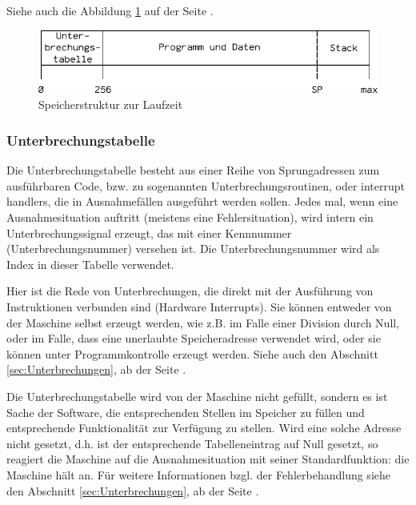 Siehe auch die Abbildung \ref{fig:Speicherstruktur} auf der Seite
\pageref{fig:Speicherstruktur}.

\begin{figure}[htp]
 \centering
 \includegraphics{./img/UMach-Speicherstruktur}
 \caption[Speicherstruktur]{Speicherstruktur zur Laufzeit}
 \label{fig:Speicherstruktur}
\end{figure}



\subsubsection{Unterbrechungstabelle}
\label{subsubsec:Unterbrechungstabelle}

Die Unterbrechungstabelle besteht aus einer Reihe von Sprungadressen zum
ausführbaren Code, bzw. zu sogenannten Unterbrechungsroutinen, oder \glqq
interrupt handlers\grqq, die in Ausnahmefällen ausgeführt werden sollen. Jedes
mal, wenn eine Ausnahmesituation auftritt (meistens eine Fehlersituation), wird
intern ein Unterbrechungssignal erzeugt, das mit einer Kennnummer
(Unterbrechungsnummer) versehen ist. Die Unterbrechungsnummer wird als Index in
dieser Tabelle verwendet.

Hier ist die Rede von Unterbrechungen, die direkt mit der Ausführung von
Instruktionen verbunden sind (Hardware Interrupts). Sie können entweder von der
Maschine selbst erzeugt werden, wie z.B. im Falle einer Division durch Null,
oder im Falle, dass eine unerlaubte Speicheradresse verwendet wird, oder sie
können unter Programmkontrolle erzeugt werden. Siehe auch den Abschnitt
\ref{sec:Unterbrechungen}, ab der Seite \pageref{sec:Unterbrechungen}.


Die Unterbrechungstabelle wird von der Maschine nicht gefüllt, sondern es ist
Sache der Software, die entsprechenden Stellen im Speicher zu füllen und
entsprechende Funktionalität zur Verfügung zu stellen. Wird eine solche Adresse
nicht gesetzt, d.h. ist der entsprechende Tabelleneintrag auf Null gesetzt, so
reagiert die Maschine auf die Ausnahmesituation mit seiner Standardfunktion: die
Maschine hält an. Für weitere Informationen bzgl. der Fehlerbehandlung siehe den
Abschnitt \ref{sec:Unterbrechungen}, ab der Seite \pageref{sec:Unterbrechungen}.

